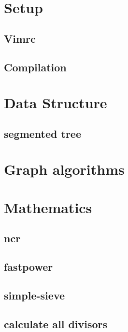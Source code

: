 \section{Setup}
\subsection{Vimrc}
\raggedbottom
\hrulefill
\subsection{Compilation}
\raggedbottom
\hrulefill


\section{Data Structure}
\subsection{segmented tree}
\raggedbottom
\section{Graph algorithms}

\section{Mathematics}
\subsection{ncr}
\raggedbottom
\hrulefill
\subsection{fastpower}
\raggedbottom
\hrulefill
\subsection{simple-sieve}
\raggedbottom
\hrulefill
\subsection{calculate all divisors}
\raggedbottom
\hrulefill
